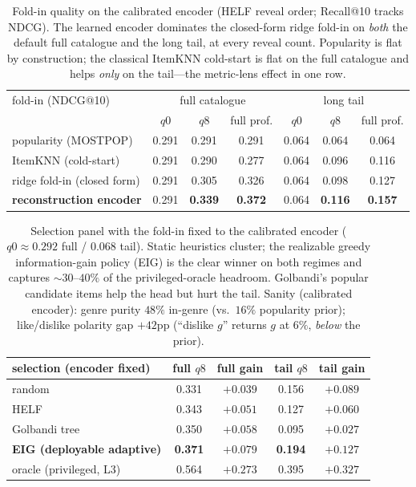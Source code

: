 \documentclass[11pt]{article}
\begin{document}
\begin{table}[h]\centering\small
\begin{tabular}{lcccccc}
\toprule
fold-in (NDCG@10) & \multicolumn{3}{c}{full catalogue} & \multicolumn{3}{c}{long tail}\\
 & $q0$ & $q8$ & full prof. & $q0$ & $q8$ & full prof.\\
\midrule
popularity (MOSTPOP) & 0.291 & 0.291 & 0.291 & 0.064 & 0.064 & 0.064\\
ItemKNN (cold-start) & 0.291 & 0.290 & 0.277 & 0.064 & 0.096 & 0.116\\
ridge fold-in (closed form) & 0.291 & 0.305 & 0.326 & 0.064 & 0.098 & 0.127\\
\textbf{reconstruction encoder} & 0.291 & \textbf{0.339} & \textbf{0.372} & 0.064 & \textbf{0.116} & \textbf{0.157}\\
\bottomrule
\end{tabular}
\caption{Fold-in quality on the calibrated encoder (HELF reveal order; Recall@10 tracks NDCG). The learned encoder
dominates the closed-form ridge fold-in on \emph{both} the default full catalogue and the long tail, at every reveal
count. Popularity is flat by construction; the classical ItemKNN cold-start is flat on the full catalogue and helps
\emph{only} on the tail---the metric-lens effect in one row.}
\label{tab:recon}
\end{table}

\begin{table}[h]\centering\small
\begin{tabular}{lcccc}
\toprule
selection (encoder fixed) & full $q8$ & full gain & tail $q8$ & tail gain\\
\midrule
random & 0.331 & $+0.039$ & 0.156 & $+0.089$\\
HELF \cite{rashid02} & 0.343 & $+0.051$ & 0.127 & $+0.060$\\
Golbandi tree \cite{golbandi11} & 0.350 & $+0.058$ & 0.095 & $+0.027$\\
\textbf{EIG (deployable adaptive)} & \textbf{0.371} & $\mathbf{+0.079}$ & \textbf{0.194} & $\mathbf{+0.127}$\\
oracle (privileged, L3) & 0.564 & $+0.273$ & 0.395 & $+0.327$\\
\bottomrule
\end{tabular}
\caption{Selection panel with the fold-in fixed to the calibrated encoder ($q0\!\approx\!0.292$ full / $0.068$ tail).
Static heuristics cluster; the realizable greedy information-gain policy (EIG) is the clear winner on both regimes and
captures $\sim\!30$--$40\%$ of the privileged-oracle headroom. Golbandi's popular candidate items help the head but
hurt the tail. Sanity (calibrated encoder): genre purity $48\%$ in-genre (vs.\ $16\%$ popularity prior); like/dislike
polarity gap $+42$pp (``dislike $g$'' returns $g$ at $6\%$, \emph{below} the prior).}
\label{tab:select}
\end{table}
\end{document}
